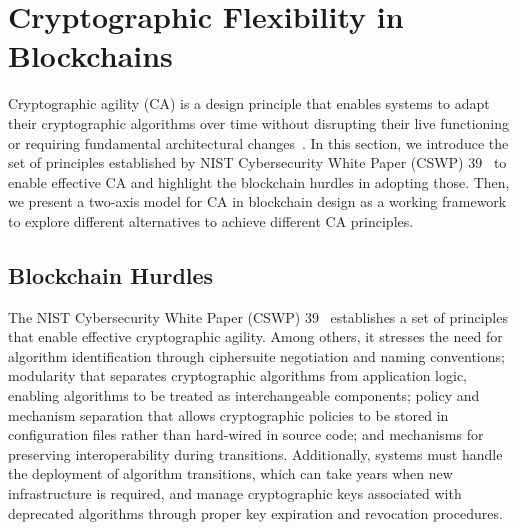 \section{Cryptographic Flexibility in Blockchains}

Cryptographic agility (CA) is a design principle that enables systems to adapt their cryptographic algorithms over time without disrupting their live functioning or requiring fundamental architectural changes~\cite{NIST:BCC+25}. 
In this section, we introduce the set of principles established by NIST Cybersecurity White Paper (CSWP) 39~\cite{NIST:BCC+25} to enable effective CA and highlight the blockchain hurdles in adopting those. 
Then, we present a two-axis model for CA in blockchain design as a working framework to explore different alternatives to achieve different CA principles.

\subsection{Blockchain Hurdles}\label{ss:blockchain-hurdles}

The NIST Cybersecurity White Paper (CSWP) 39~\cite{NIST:BCC+25} establishes a set of principles that enable effective cryptographic agility. 
Among others, it stresses the need for algorithm identification through ciphersuite negotiation and naming conventions; modularity that separates cryptographic algorithms from application logic, enabling algorithms to be treated as interchangeable components; policy and mechanism separation that allows cryptographic policies to be stored in configuration files rather than hard-wired in source code; and mechanisms for preserving interoperability during transitions. Additionally, systems must handle the deployment of algorithm transitions, which can take years when new infrastructure is required, and manage cryptographic keys associated with deprecated algorithms through proper key expiration and revocation procedures.

